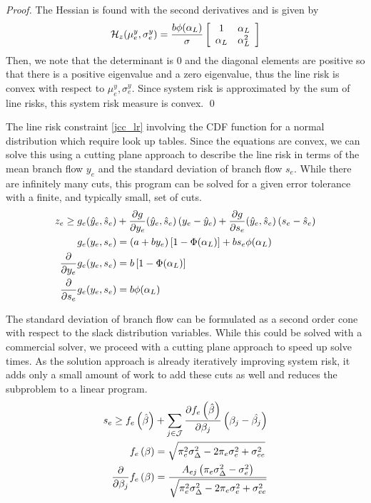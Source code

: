 \begin{proof}
The Hessian is found with the second derivatives and is given by
\begin{equation}
\mathcal{H}_z(\mu^y_e,\sigma^y_e) = \frac{b \phi(\alpha_L)}{\sigma}
\left[ 
\begin{array}{c c}
1 & \alpha_L \\
\alpha_L & \alpha_L^2
\end{array}
\right]
\end{equation}
Then, we note that the determinant is 0 and the diagonal elements are positive so that there is a positive eigenvalue and a zero eigenvalue, thus the line risk is convex with respect to $\mu^y_e, \sigma^y_e$.  Since system risk is approximated by the sum of line risks, this system risk measure is convex. \qed
\end{proof}

The line risk constraint \ref{jcc_lr} involving the CDF function for a normal distribution which require look up tables. Since the equations are convex, we can solve this using a cutting plane approach to describe the line risk in terms of the mean branch flow $y_e$ and the standard deviation of branch flow $s_e$.  While there are infinitely many cuts, this program can be solved for a given error tolerance with a finite, and typically small, set of cuts.
\begin{subequations}
\label{line_risk_cuts}
\begin{align}
z_e \geq g_e(\hat{y}_e,\hat{s}_e) &+ \frac{\partial g}{\partial y_e}(\hat{y}_e,\hat{s}_e) \left(y_e - \hat{y}_e \right) 
+ \frac{\partial g}{\partial s_e}(\hat{y}_e,\hat{s}_e) \left(s_e - \hat{s}_e \right) \\
g_e(y_e,s_e) &= (a + b y_e)\left[ 1 - \Phi(\alpha_L) \right]  + b s_e \phi(\alpha_L)  \\
 \frac{\partial}{\partial y_e}g_e(y_e,s_e) &= b\left[ 1 - \Phi(\alpha_L) \right]\\
\frac{\partial}{\partial s_e}g_e(y_e,s_e) &= b \phi(\alpha_L) 
\end{align}
\end{subequations}

The standard deviation of branch flow can be formulated as a second order cone with respect to the slack distribution variables.  While this could be solved with a commercial solver, we proceed with a cutting plane approach to speed up solve times.  As the solution approach is already iteratively improving system risk, it adds only a small amount of work to add these cuts as well and reduces the subproblem to a linear program.
\begin{subequations}
\label{branch_var_cuts}
\begin{align}
s_e \geq f_e\left(\hat{\beta}\right) &+ \sum_{j \in \mathcal{J}} \frac{\partial f_e\left(\hat{\beta} \right)}{\partial \beta_j} \left( \beta_j - \hat{\beta_j} \right)\\
  f_e\left(\beta\right) &= \sqrt{\pi_e^2 \sigma_\Delta^2 - 2 \pi_e \sigma_e^2  + \sigma_{ee}^2 }\\
  \frac{\partial}{\partial \beta_j}f_e\left(\beta\right) &= \frac{A_{ej} \left( \pi_e \sigma_\Delta^2 - \sigma_e^2 \right)}{\sqrt{\pi_e^2 \sigma_\Delta^2 - 2 \pi_e \sigma_e^2  + \sigma_{ee}^2 }}
\end{align}
\end{subequations}




